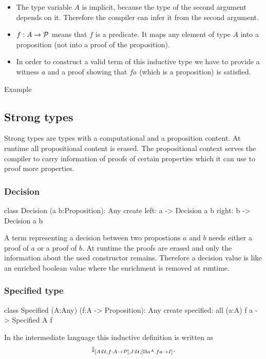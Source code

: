 \begin{itemize}
\item The type variable $A$ is implicit, because the type of the second
  argument depends on it. Therefore the compiler can infer it from the second
  argument.

\item $f:A\to {\cal{P}}$ means that $f$ is a predicate. It maps any element of
  type $A$ into a proposition (not into a proof of the proposition).

\item In order to construct a valid term of this inductive type we have to
  provide a witness $a$ and a proof showing that $f a$ (which is a
  proposition) is satisfied.
\end{itemize}

Example


\subsection{Strong types}
\label{sec:prelude-strong-types}

Strong types are types with a computational and a proposition content. At
runtime all propositional content is erased. The propositional context serves
the compiler to carry information of proofs of certain properties which it can
use to proof more properties.


\subsubsection{Decision}
%
\begin{alba}
  class
    Decision (a b:Proposition): Any
  create
    left:  a -> Decision a b
    right: b -> Decision a b
\end{alba}

A term representing a decision between two propostions $a$ and $b$ needs
either a proof of $a$ or a proof of $b$. At runtime the proofs are erased and
only the information about the used constructor remains. Therefore a decision
value is like an enriched boolean value where the enrichment is removed at
runtime.


\subsubsection{Specified type}

\begin{alba}
  class
     Specified (A:Any) (f:A -> Proposition): Any
  create
     specified: all (a:A) f a -> Specified A f
\end{alba}

In the intermediate language this inductive definition is written as
$$
\mathbb{I}_{[A:{\cal{U}}, f:A \to {\cal{P}}], I:{\cal{U}}, [\Pi a^A . f a \to I]}.
$$






